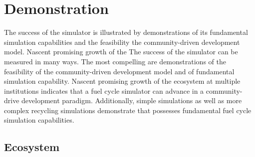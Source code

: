 \section{Demonstration}
%

%



The success of the \Cyclus simulator is illustrated by demonstrations
of its fundamental simulation capabilities and the feasibility the
 community-driven \Cyclus development model.
Nascent promising growth of the \Cyclus 
The success of the \Cyclus simulator can be measured in many ways. 
The most compelling are demonstrations of the feasibility of the \Cyclus community-driven development 
model and of fundamental simulation capability. Nascent promising growth of the \Cyclus 
ecosystem at multiple institutions indicates that a fuel cycle simulator can 
advance in a community-drive development paradigm. Additionally, simple 
simulations as well as more complex recycling simulations demonstrate that 
\Cyclus possesses fundamental fuel cycle simulation capabilities.

\subsection{Ecosystem}

